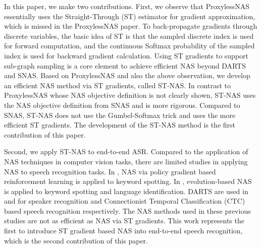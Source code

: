 \documentclass{article}
\begin{document}
In this paper, we make two contributions. First, we observe that ProxylessNAS essentially uses the Straight-Through (ST) estimator \cite{bengio2013estimating} for gradient approximation, which is missed in the ProxylessNAS paper.
To back-propagate gradients through discrete variables, the basic idea of ST is that the sampled discrete index is used for forward computation, and the continuous Softmax probability of the sampled index is used for backward gradient calculation.
Using ST gradients to support sub-graph sampling is a core element to achieve efficient NAS beyond DARTS and SNAS.
Based on ProxylessNAS and also the above observation, we develop an efficient NAS method via ST gradients, called ST-NAS.
In contrast to ProxylessNAS whose NAS objective definition is not clearly shown, ST-NAS uses the NAS objective definition from SNAS and is more rigorous.
Compared to SNAS, ST-NAS does not use the Gumbel-Softmax trick and uses the more efficient ST gradients.
The development of the ST-NAS method is the first contribution of this paper.


Second, we apply ST-NAS to end-to-end ASR.
Compared to the application of NAS techniques in computer vision tasks, there are limited studies in applying NAS to speech recognition tasks.
In \cite{veniat2019stochastic}, NAS via policy gradient based reinforcement learning \cite{veniat2018learning} is applied to keyword spotting.
In \cite{mazzawi2019improving}, evolution-based NAS is applied to keyword spotting and language identification.
DARTS are used in \cite{ding2020autospeech} and \cite{chen2020darts} for speaker recognition and Connectionist Temporal Classification (CTC) based speech recognition respectively.
The NAS methods used in these previous studies are not as efficient as NAS via ST gradients. This work represents the first to introduce ST gradient based NAS into end-to-end speech recognition, which is the second contribution of this paper.
\end{document}
